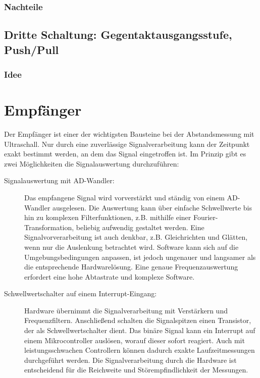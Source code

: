 
\subsubsection{Nachteile}



\subsection{Dritte Schaltung: Gegentaktausgangsstufe, Push/Pull}

\subsubsection{Idee}


\section{Empfänger}
Der Empfänger ist einer der wichtigsten Bausteine bei der Abstandsmessung mit Ultraschall. Nur durch eine zuverlässige Signalverarbeitung kann der Zeitpunkt exakt bestimmt werden, an dem das Signal eingetroffen ist. Im Prinzip gibt es zwei Möglichkeiten die Signalauswertung durchzuführen:
\begin{description} %
	\item[Signalauswertung mit AD-Wandler:] Das empfangene Signal wird vorverstärkt und ständig von einem AD-Wandler ausgelesen. Die Auswertung kann über einfache Schwellwerte bis hin zu komplexen Filterfunktionen, z.B. mithilfe einer Fourier-Transformation, beliebig aufwendig gestaltet werden. Eine Signalvorverarbeitung ist auch denkbar, z.B. Gleichrichten und Glätten, wenn nur die Auslenkung betrachtet wird. Software kann sich auf die Umgebungsbedingungen anpassen, ist jedoch ungenauer und langsamer als die entsprechende Hardwarelösung. Eine genaue Frequenzauswertung erfordert eine hohe Abtastrate und komplexe Software.
	\item[Schwellwertschalter auf einem Interrupt-Eingang:] Hardware übernimmt die Signalverarbeitung mit Verstärkern und Frequenzfiltern. Anschließend schalten die Signalspitzen einen Transistor, der als Schwellwertschalter dient. Das binäre Signal kann ein Interrupt auf einem Mikrocontroller auslösen, worauf dieser sofort reagiert. Auch mit leistungsschwachen Controllern können dadurch exakte Laufzeitmessungen durchgeführt werden. Die Signalverarbeitung durch die Hardware ist entscheidend für die Reichweite und Störempfindlichkeit der Messungen.
\end{description}

